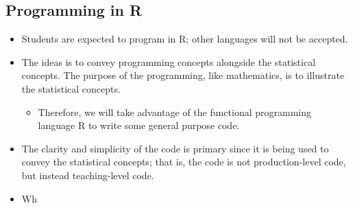 \subsection{Programming in R}
\begin{itemize}
    \item Students are expected to program in R\@; other languages will not
          be accepted.
    \item The ideas is to convey programming concepts alongside the statistical concepts.
          The purpose of the programming, like mathematics, is to illustrate the statistical
          concepts.
          \begin{itemize}
              \item Therefore, we will take advantage of the functional programming language
                    R to write some general purpose code.
          \end{itemize}
    \item The clarity and simplicity of the code is primary since it is being used
          to convey the statistical concepts; that is, the code is not
          production-level code, but instead teaching-level code.
    \item Wh
\end{itemize}
